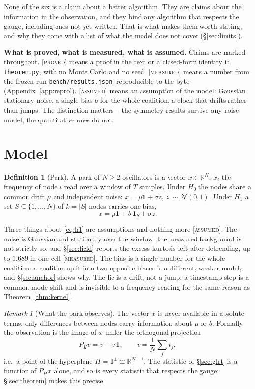 \documentclass[10pt,twocolumn,a4paper]{article}
\newcommand{\proved}{\textcolor{teal!70!black}{\textsc{[proved]}}}
\newcommand{\measured}{\textcolor{blue!70!black}{\textsc{[measured]}}}
\newcommand{\assumed}{\textcolor{orange!80!black}{\textsc{[assumed]}}}
\theoremstyle{definition}
\newtheorem{definition}[theorem]{Definition}
\theoremstyle{remark}
\newtheorem{remark}[theorem]{Remark}
\newcommand{\PH}{P_{H}}
\newcommand{\one}{\mathbf{1}}
\newcommand{\R}{\mathbb{R}}
\begin{document}
None of the six is a claim about a better algorithm. They are claims about the
information in the observation, and they bind any algorithm that respects the
gauge, including ones not yet written. That is what makes them worth stating, and
why they come with a list of what the model does not cover
(\S\ref{sec:limits}).

\medskip
\noindent\textbf{What is proved, what is measured, what is assumed.} Claims are
marked throughout. \proved{} means a proof in the text or a closed-form identity
in \texttt{theorem.py}, with no Monte Carlo and no seed. \measured{} means a
number from the frozen run \texttt{bench/results.json}, reproducible to the byte
(Appendix~\ref{app:repro}). \assumed{} means an assumption of the model: Gaussian
stationary noise, a single bias $b$ for the whole coalition, a clock that drifts
rather than jumps. The distinction matters -- the symmetry results survive any
noise model, the quantitative ones do not.

\section{Model}
\label{sec:model}

\begin{definition}[Park]
\label{def:park}
A park of $N\ge2$ oscillators is a vector $x\in\R^N$, $x_i$ the frequency of
node $i$ read over a window of $T$ samples. Under $H_0$ the nodes share a common
drift $\mu$ and independent noise: $x=\mu\one+\sigma z$, $z_i\sim\mathcal N(0,1)$.
Under $H_1$ a set $S\subseteq\{1,\dots,N\}$ of $k=|S|$ nodes carries one bias,
\begin{equation}
x=\mu\one+b\,\one_S+\sigma z .
\label{eq:h1}
\end{equation}
\end{definition}

Three things about \eqref{eq:h1} are assumptions and nothing more \assumed. The
noise is Gaussian and stationary over the window: the measured background is not
strictly so, and \S\ref{sec:field} reports the excess kurtosis left after
detrending, up to $1.689$ in one cell \measured. The bias is a single number for
the whole coalition: a coalition split into two opposite biases is a different,
weaker model, and \S\ref{sec:anchor} shows why. The lie is a drift, not a jump: a
timestamp step is a common-mode shift and is invisible to a frequency reading for
the same reason as Theorem~\ref{thm:kernel}.

\begin{remark}[What the park observes]
The vector $x$ is never available in absolute terms: only differences between
nodes carry information about $\mu$ or $b$. Formally the observation is the image
of $x$ under the orthogonal projection
\begin{equation}
\PH v = v-\bar v\,\one,\qquad \bar v=\frac1N\sum_j v_j,
\label{eq:ph}
\end{equation}
i.e.\ a point of the hyperplane $H=\one^{\perp}\cong\R^{N-1}$. The statistic of
\S\ref{sec:glrt} is a function of $\PH x$ alone, and so is every statistic that
respects the gauge; \S\ref{sec:theorem} makes this precise.
\end{remark}
\end{document}
